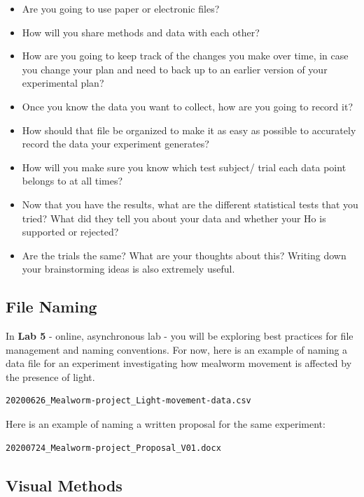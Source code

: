 \documentclass[
]{book}
\providecommand{\tightlist}{%
  \setlength{\itemsep}{0pt}\setlength{\parskip}{0pt}}
\begin{document}
\begin{itemize}
\tightlist
\item
  Are you going to use paper or electronic files?
\item
  How will you share methods and data with each other?
\item
  How are you going to keep track of the changes you make over time, in case you change your plan and need to back up to an earlier version of your experimental plan?
\item
  Once you know the data you want to collect, how are you going to record it?
\item
  How should that file be organized to make it as easy as possible to accurately record the data your experiment generates?
\item
  How will you make sure you know which test subject/ trial each data point belongs to at all times?
\item
  Now that you have the results, what are the different statistical tests that you tried? What did they tell you about your data and whether your Ho is supported or rejected?
\item
  Are the trials the same? What are your thoughts about this? Writing down your brainstorming ideas is also extremely useful.
\end{itemize}

\hypertarget{file-naming}{%
\subsection*{File Naming}\label{file-naming}}

In \textbf{Lab 5} - online, asynchronous lab - you will be exploring best practices for file management and naming conventions. For now, here is an example of naming a data file for an experiment investigating how mealworm movement is affected by the presence of light.

\begin{verbatim}
20200626_Mealworm-project_Light-movement-data.csv 
\end{verbatim}

Here is an example of naming a written proposal for the same experiment:

\begin{verbatim}
20200724_Mealworm-project_Proposal_V01.docx
\end{verbatim}

\hypertarget{visual-methods}{%
\subsection*{Visual Methods}\label{visual-methods}}
\end{document}
